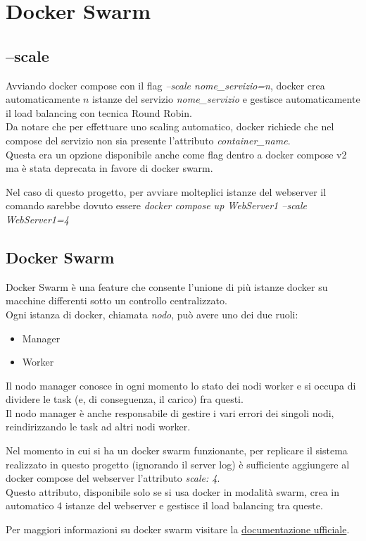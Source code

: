 \documentclass[../DocumentazioneProgetto.tex]{subfiles}
\begin{document}
	\section{Docker Swarm}
	\label{sec:DockerSwarm}
	\subsection{--scale} 
	Avviando docker compose con il flag \textit{--scale nome\_servizio=n}, docker crea automaticamente \(n\) istanze del servizio \textit{nome\_servizio} e gestisce automaticamente il load balancing con tecnica Round Robin.\\
	Da notare che per effettuare uno scaling automatico, docker richiede che nel compose del servizio non sia presente l'attributo \textit{container\_name}.\\ 
	Questa era un opzione disponibile anche come flag dentro a docker compose v2 ma è stata deprecata in favore di docker swarm. 

	Nel caso di questo progetto, per avviare molteplici istanze del webserver il comando sarebbe dovuto essere \textit{docker compose up WebServer1 --scale WebServer1=4} 
	\subsection{Docker Swarm} 
	Docker Swarm è una feature che consente l'unione di più istanze docker su macchine differenti sotto un controllo centralizzato.\\
	Ogni istanza di docker, chiamata \textit{nodo}, può avere uno dei due ruoli: 
	\begin{itemize}
		\item Manager
		\item Worker
	\end{itemize}
	Il nodo manager conosce in ogni momento lo stato dei nodi worker e si occupa di dividere le task (e, di conseguenza, il carico) fra questi.\\
	Il nodo manager è anche responsabile di gestire i vari errori dei singoli nodi, reindirizzando le task ad altri nodi worker.

	Nel momento in cui si ha un docker swarm funzionante, per replicare il sistema realizzato in questo progetto (ignorando il server log) è sufficiente aggiungere al docker compose del webserver l'attributo \textit{scale: 4}.\\
	Questo attributo, disponibile solo se si usa docker in modalità swarm, crea in automatico 4 istanze del webserver e gestisce il load balancing tra queste.
	
	Per maggiori informazioni su docker swarm visitare la \href{https://docs.docker.com/engine/swarm/}{documentazione ufficiale}.
\end{document}
